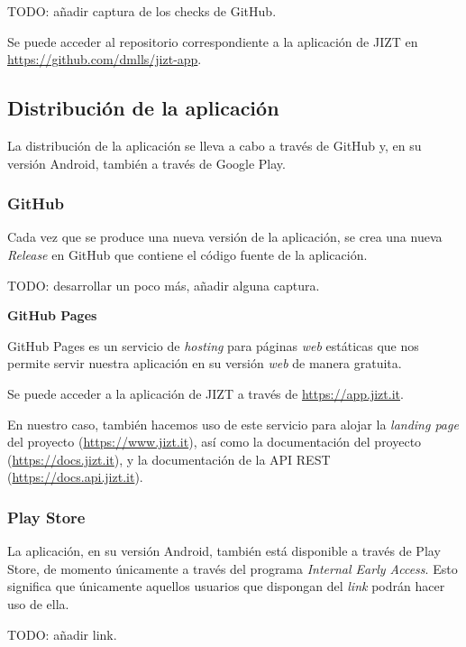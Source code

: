 TODO: añadir captura de los checks de GitHub.

Se puede acceder al repositorio correspondiente a la aplicación de JIZT en \href{https://github.com/dmlls/jizt-app}{https://github.com/dmlls/jizt-app}.

\subsection{Distribución de la aplicación}

La distribución de la aplicación se lleva a cabo a través de GitHub y, en su versión Android, también a través de Google Play.

\subsubsection{GitHub}

Cada vez que se produce una nueva versión de la aplicación, se crea una nueva \emph{Release} en GitHub que contiene el código fuente de la aplicación.

TODO: desarrollar un poco más, añadir alguna captura.

\bigskip
\noindent
\textbf{{\small GitHub Pages}}

GitHub Pages es un servicio de \emph{hosting} para páginas \emph{web} estáticas que nos permite servir nuestra aplicación en su versión \emph{web} de manera gratuita.

Se puede acceder a la aplicación de JIZT a través de \href{https://app.jizt.it}{https://app.jizt.it}.

En nuestro caso, también hacemos uso de este servicio para alojar la \emph{landing page} del proyecto (\href{https://www.jizt.it}{https://www.jizt.it}), así como la documentación del proyecto (\href{https://docs.jizt.it}{https://docs.jizt.it}), y la documentación de la API REST (\href{https://docs.api.jizt.it}{https://docs.api.jizt.it}).

\subsubsection{Play Store}

La aplicación, en su versión Android, también está disponible a través de Play Store, de momento únicamente a través del programa \emph{Internal Early Access}. Esto significa que únicamente aquellos usuarios que dispongan del \emph{link} podrán hacer uso de ella.

TODO: añadir link.

